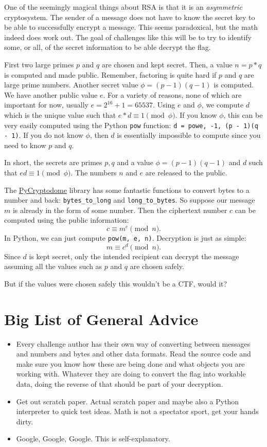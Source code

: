 \documentclass[letterpaper]{article}
\begin{document}
One of the seemingly magical things about RSA is that it is an \emph{asymmetric} cryptosystem.
The sender of a message does not have to know the secret key to be able to successfully encrypt a message.
This seems paradoxical, but the math indeed does work out.
The goal of challenges like this will be to try to identify some, or all, of the secret information to be able decrypt the flag.

First two large primes $p$ and $q$ are chosen and kept secret.
Then, a value $n = p * q$ is computed and made public.
Remember, factoring is quite hard if $p$ and $q$ are large prime numbers.
Another secret value $\phi = (p - 1)(q - 1)$ is computed.
We have another public value $e$.
For a variety of reasons, none of which are important for now, usually $e = 2^{16} + 1 = 65537$.
Using $e$ and $\phi$, we compute $d$ which is the unique value such that $e * d \equiv 1 \pmod{\phi}$.
If you know $\phi$, this can be very easily computed using the Python \texttt{pow} function: \texttt{d = pow{e, -1, (p - 1)(q - 1)}}.
If you do not know $\phi$, then $d$ is essentially impossible to compute since you need to know $p$ and $q$.

In short, the secrets are primes $p, q$ and a value $\phi = (p - 1) (q - 1)$ and $d$ such that $ed \equiv 1 \pmod{\phi}$.
The numbers $n$ and $e$ are released to the public.

The \href{https://www.pycryptodome.org/}{PyCryptodome} library has some fantastic functions to convert bytes to a number and back: \texttt{bytes_to_long} and \texttt{long_to_bytes}.
So suppose our message $m$ is already in the form of some number.
Then the ciphertext number $c$ can be computed using the public information:
\[
  c \equiv m^{e} \pmod{n}.
\]
In Python, we can just compute \texttt{pow(m, e, n)}.
Decryption is just as simple:
\[
  m \equiv c^{d} \pmod{n}.
\]
Since $d$ is kept secret, only the intended recipient can decrypt the message assuming all the values such as $p$ and $q$ are chosen safely.

But if the values were chosen safely this wouldn't be a CTF, would it?

\section*{Big List of General Advice}

\begin{itemize}
\item Every challenge author has their own way of converting between messages and numbers and bytes and other data formats.
      Read the source code and make sure you know how these are being done and what objects you are working with.
      Whatever they are doing to convert the flag into workable data, doing the reverse of that should be part of your decryption.
\item Get out scratch paper.
      Actual scratch paper and maybe also a Python interpreter to quick test ideas.
      Math is not a spectator sport, get your hands dirty.
\item Google, Google, Google.
      This is self-explanatory.
\end{itemize}

\printbibliography
\end{document}
